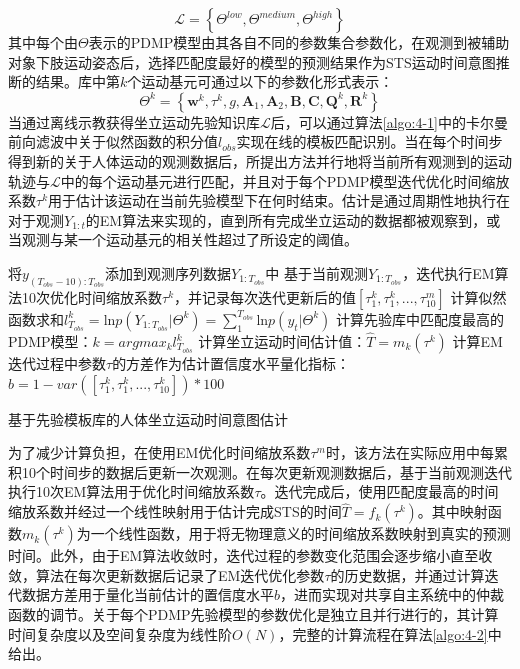 \begin{equation}
    \mathscr{L}=\left\{\Theta^{low}, \Theta^{medium}, \Theta^{high}\right\}
    \label{eq:4-37}
\end{equation}
其中每个由$\Theta$表示的PDMP模型由其各自不同的参数集合参数化，在观测到被辅助对象下肢运动姿态后，选择匹配度最好的模型的预测结果作为STS运动时间意图推断的结果。库中第$k$个运动基元可通过以下的参数化形式表示：
\begin{equation}
    \Theta ^{k}=\left\{\pmb{w}^{k}, \tau^{k}, g, \mathbf{A}_1, \mathbf{A}_2, \mathbf{B}, \mathbf{C}, \mathbf{Q}^{k}, \mathbf{R}^{k}\right\}
    \label{eq:4-38}
\end{equation}
当通过离线示教获得坐立运动先验知识库$\mathscr{L}$后，可以通过算法\ref{algo:4-1}中的卡尔曼前向滤波中关于似然函数的积分值$l_{obs}$实现在线的模板匹配识别。当在每个时间步得到新的关于人体运动的观测数据后，所提出方法并行地将当前所有观测到的运动轨迹与$\mathscr{L}$中的每个运动基元进行匹配，并且对于每个PDMP模型迭代优化时间缩放系数$\tau^{k}$用于估计该运动在当前先验模型下在何时结束。估计是通过周期性地执行在对于观测$Y_{1:t}$的EM算法来实现的，直到所有完成坐立运动的数据都被观察到，或当观测与某一个运动基元的相关性超过了所设定的阈值。
\begin{algorithm}[htb]
    \SetAlgoLined
    {
        将$y_{{(T_{obs}-10)}:T_{obs}}$添加到观测序列数据$Y_{1:T_{obs}}$中 \;
        {
            基于当前观测$Y_{1:T_{obs}}$，迭代执行EM算法10次优化时间缩放系数$\tau^k$，并记录每次迭代更新后的值$[\tau^k_1,\tau^k_1,...,\tau^m_{10}]$\;
            计算似然函数求和$l_{T_{obs}}^k=\text{ln}p(Y_{1:T_{obs}}|\Theta ^{k})=\sum_{1}^{T_{obs}} \text{ln}p(y_t|\Theta ^{k})$ \;
        }
        计算先验库中匹配度最高的PDMP模型：$k=argmax_k l_{T_{obs}}^k$\;
        计算坐立运动时间估计值：$\hat T = m_k(\tau^k)$\;
        计算EM迭代过程中参数$\tau$的方差作为估计置信度水平量化指标：$b = 1 - var([\tau^k_1,\tau^k_1,...,\tau^k_{10}]) * 100$\;
    }
    \caption{基于先验模板库的人体坐立运动时间意图估计}
    \label{algo:4-2}
\end{algorithm}

为了减少计算负担，在使用EM优化时间缩放系数$\tau^{m}$时，该方法在实际应用中每累积10个时间步的数据后更新一次观测。在每次更新观测数据后，基于当前观测迭代执行10次EM算法用于优化时间缩放系数$\tau$。迭代完成后，使用匹配度最高的时间缩放系数并经过一个线性映射用于估计完成STS的时间$\hat T=f_k(\tau^k)$。其中映射函数$m_k(\tau^k)$为一个线性函数，用于将无物理意义的时间缩放系数映射到真实的预测时间。此外，由于EM算法收敛时，迭代过程的参数变化范围会逐步缩小直至收敛，算法在每次更新数据后记录了EM迭代优化参数$\tau$的历史数据，并通过计算迭代数据方差用于量化当前估计的置信度水平$b$，进而实现对共享自主系统中的仲裁函数的调节。关于每个PDMP先验模型的参数优化是独立且并行进行的，其计算时间复杂度以及空间复杂度为线性阶$O(N)$，完整的计算流程在算法\ref{algo:4-2}中给出。


